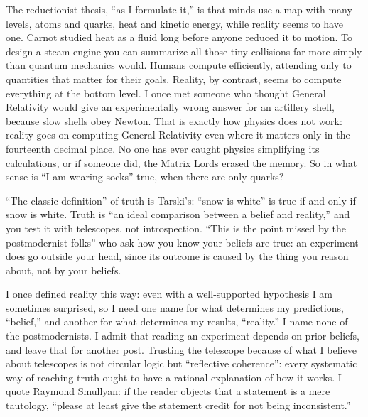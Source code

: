 
The reductionist thesis, ``as I formulate it,'' is that minds use a map with many levels, atoms and quarks, heat and kinetic energy, while reality seems to have one. Carnot studied heat as a fluid long before anyone reduced it to motion. To design a steam engine you can summarize all those tiny collisions far more simply than quantum mechanics would. Humans compute efficiently, attending only to quantities that matter for their goals. Reality, by contrast, seems to compute everything at the bottom level. I once met someone who thought General Relativity would give an experimentally wrong answer for an artillery shell, because slow shells obey Newton. That is exactly how physics does not work: reality goes on computing General Relativity even where it matters only in the fourteenth decimal place. No one has ever caught physics simplifying its calculations, or if someone did, the Matrix Lords erased the memory. So in what sense is ``I am wearing socks'' true, when there are only quarks?

``The classic definition'' of truth is Tarski's: ``snow is white'' is true if and only if snow is white. Truth is ``an ideal comparison between a belief and reality,'' and you test it with telescopes, not introspection.  ``This is the point missed by the postmodernist folks'' who ask how you know your beliefs are true: an experiment does go outside your head, since its outcome is caused by the thing you reason about, not by your beliefs.

I once defined reality this way: even with a well-supported hypothesis I am sometimes surprised, so I need one name for what determines my predictions, ``belief,'' and another for what determines my results, ``reality.'' I name none of the postmodernists. I admit that reading an experiment depends on prior beliefs, and leave that for another post. Trusting the telescope because of what I believe about telescopes is not circular logic but ``reflective coherence'': every systematic way of reaching truth ought to have a rational explanation of how it works. I quote Raymond Smullyan: if the reader objects that a statement is a mere tautology, ``please at least give the statement credit for not being inconsistent.''

